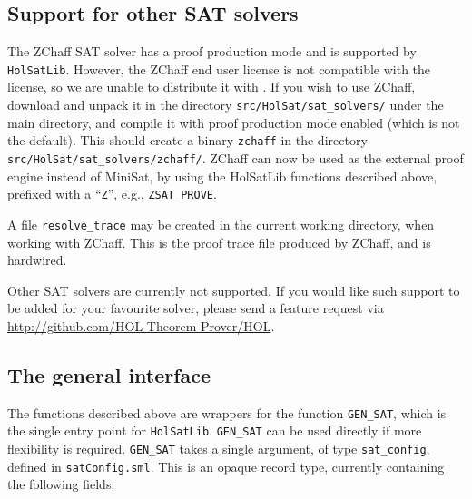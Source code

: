 \subsection{Support for other SAT solvers}\label{subsec:hs-zchaff}

The ZChaff SAT solver has a proof production mode and is supported by {\tt{HolSatLib}}. However, the ZChaff end user license is not compatible with the \HOL{} license, so we are unable to distribute it with \HOL{}. If you wish to use ZChaff, download and unpack it in the directory {\tt src/HolSat/sat\_solvers/} under the main \HOL{} directory, and compile it with proof production mode enabled (which is not the default). This should create a binary {\tt zchaff} in the directory {\tt src/HolSat/sat\_solvers/zchaff/}. ZChaff can now be used as the external proof engine instead of MiniSat, by using the HolSatLib functions described above, prefixed with a ``{\tt Z}'', e.g., {\tt ZSAT\_PROVE}.

A file \texttt{resolve\_trace} may be created in the current working directory, when working with ZChaff. This is the proof trace file produced by ZChaff, and is hardwired.

Other SAT solvers are currently not supported. If you would like such support to be added for your favourite solver, please send a feature request via \url{http://github.com/HOL-Theorem-Prover/HOL}.

\subsection{The general interface}

The functions described above are wrappers for the function \texttt{GEN\_SAT}, which is the single entry point for {\tt{HolSatLib}}. \texttt{GEN\_SAT} can be used directly if more flexibility is required. \texttt{GEN\_SAT} takes a single argument, of type \texttt{sat\_config}, defined in \texttt{satConfig.sml}. This is an opaque record type, currently containing the following fields:

